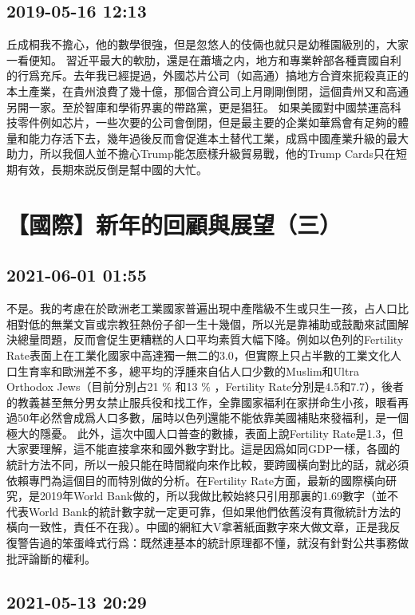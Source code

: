 \documentclass[twocolumn]{ctexart}
\begin{document}
\subsection*{2019-05-16 12:13}

丘成桐我不擔心，他的數學很強，但是忽悠人的伎倆也就只是幼稚園級別的，大家一看便知。
習近平最大的軟肋，還是在蕭墻之内，地方和專業幹部各種賣國自利的行爲充斥。去年我已經提過，外國芯片公司（如高通）搞地方合資來扼殺真正的本土產業，在貴州浪費了幾十億，那個合資公司上月剛剛倒閉，這個貴州又和高通另開一家。至於智庫和學術界裏的帶路黨，更是猖狂。
如果美國對中國禁運高科技零件例如芯片，一些次要的公司會倒閉，但是最主要的企業如華爲會有足夠的體量和能力存活下去，幾年過後反而會促進本土替代工業，成爲中國產業升級的最大助力，所以我個人並不擔心Trump能怎麽樣升級貿易戰，他的Trump Cards只在短期有效，長期來説反倒是幫中國的大忙。
\section*{【國際】新年的回顧與展望（三）}
\subsection*{2021-06-01 01:55}

不是。我的考慮在於歐洲老工業國家普遍出現中產階級不生或只生一孩，占人口比相對低的無業文盲或宗教狂熱份子卻一生十幾個，所以光是靠補助或鼓勵來試圖解決總量問題，反而會促生更糟糕的人口平均素質大幅下降。例如以色列的Fertility Rate表面上在工業化國家中高達獨一無二的3.0，但實際上只占半數的工業文化人口生育率和歐洲差不多，總平均的浮腫來自佔人口少數的Muslim和Ultra Orthodox Jews（目前分別占21 \% 和13 \% ，Fertility Rate分別是4.5和7.7），後者的教義甚至無分男女禁止服兵役和找工作，全靠國家福利在家拼命生小孩，眼看再過50年必然會成爲人口多數，届時以色列還能不能依靠美國補貼來發福利，是一個極大的隱憂。
此外，這次中國人口普查的數據，表面上說Fertility Rate是1.3，但大家要理解，這不能直接拿來和國外數字對比。這是因爲如同GDP一樣，各國的統計方法不同，所以一般只能在時間縱向來作比較，要跨國橫向對比的話，就必須依賴專門為這個目的而特別做的分析。在Fertility Rate方面，最新的國際橫向研究，是2019年World Bank做的，所以我做比較始終只引用那裏的1.69數字（並不代表World Bank的統計數字就一定更可靠，但如果他們依舊沒有貫徹統計方法的橫向一致性，責任不在我）。中國的網紅大V拿著紙面數字來大做文章，正是我反復警告過的笨蛋峰式行爲：既然連基本的統計原理都不懂，就沒有針對公共事務做批評論斷的權利。
\subsection*{2021-05-13 20:29}
\end{document}
